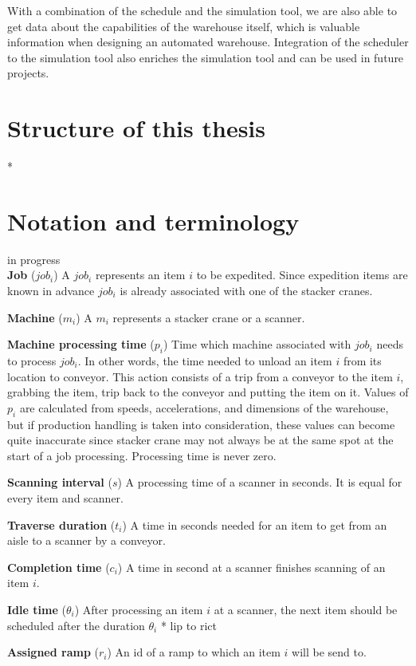 \documentclass{ctuthesis}
\begin{document}
With a combination of the schedule and the simulation tool, we are also able to get data about the capabilities of the warehouse itself, which is valuable information when designing an automated warehouse. Integration of the scheduler to the simulation tool also enriches the simulation tool and can be used in future projects.

\section{Structure of this thesis}
*

\section{Notation and terminology}
in progress\\
\noindent \textbf{Job} ($job_i$) A $job_i$ represents an item $i$ to be expedited. Since expedition items are known in advance $job_i$ is already associated with one of the stacker cranes. 

\noindent \textbf{Machine} ($m_i$) A $m_i$ represents a stacker crane or a scanner. 

\noindent \textbf{Machine processing time} ($p_i$) Time which machine associated with $job_i$ needs to process $job_i$. In other words, the time needed to unload an item $i$ from its location to conveyor. This action consists of a trip from a conveyor to the item $i$, grabbing the item, trip back to the conveyor and putting the item on it. Values of $p_i$ are calculated from speeds, accelerations, and dimensions of the warehouse, but if production handling is taken into consideration, these values can become quite inaccurate since stacker crane may not always be at the same spot at the start of a job processing. Processing time is never zero.


\noindent \textbf{Scanning interval} ($s$) A processing time of a scanner in seconds. It is equal for every item and scanner.

\noindent \textbf{Traverse duration} ($t_i$) A time in seconds needed for an item to get from an aisle to a scanner by a conveyor.

\noindent \textbf{Completion time} ($c_i$) A time in second at a scanner finishes scanning of an item $i$.

\noindent \textbf{Idle time} ($\theta_i$) After processing an item $i$ at a scanner, the next item should be scheduled after the duration $\theta_i$ * lip to rict

\noindent \textbf{Assigned ramp} ($r_i$) An id of a ramp to which an item $i$ will be send to.
\end{document}

